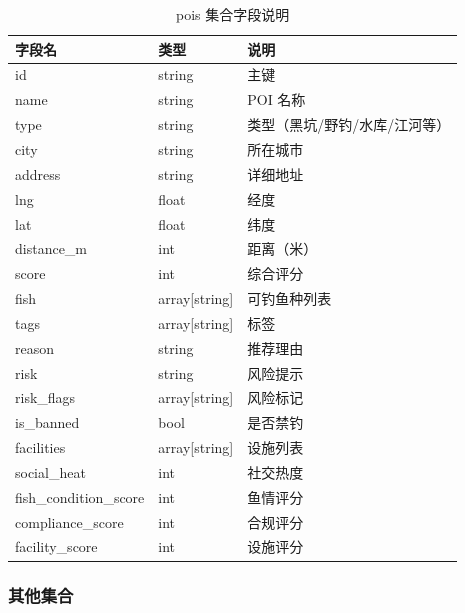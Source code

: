 \documentclass[12pt,a4paper]{ctexart}
\begin{document}
\begin{table}[H]
  \centering
  \caption{pois 集合字段说明}
  \label{tab:pois-schema}
  \begin{tabular}{p{3.5cm}p{2cm}p{6.5cm}}
    \toprule
    \textbf{字段名} & \textbf{类型} & \textbf{说明} \\
    \midrule
    id & string & 主键 \\
    name & string & POI 名称 \\
    type & string & 类型（黑坑/野钓/水库/江河等） \\
    city & string & 所在城市 \\
    address & string & 详细地址 \\
    lng & float & 经度 \\
    lat & float & 纬度 \\
    distance\_m & int & 距离（米） \\
    score & int & 综合评分 \\
    fish & array[string] & 可钓鱼种列表 \\
    tags & array[string] & 标签 \\
    reason & string & 推荐理由 \\
    risk & string & 风险提示 \\
    risk\_flags & array[string] & 风险标记 \\
    is\_banned & bool & 是否禁钓 \\
    facilities & array[string] & 设施列表 \\
    social\_heat & int & 社交热度 \\
    fish\_condition\_score & int & 鱼情评分 \\
    compliance\_score & int & 合规评分 \\
    facility\_score & int & 设施评分 \\
    \bottomrule
  \end{tabular}
\end{table}

\subsubsection{其他集合}
\end{document}
